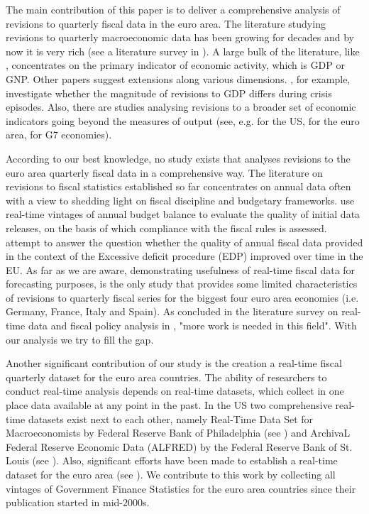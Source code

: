 The main contribution of this paper is to deliver a comprehensive analysis of revisions to quarterly fiscal data in the euro area. The literature studying revisions to quarterly macroeconomic data has been growing for decades and by now it is very rich (see a literature survey in \citet{Croushore_JEL}). A large bulk of the literature, like \citet{Mankiw-Shapiro_1986_NBER}, concentrates on the primary indicator of economic activity, which is GDP or GNP. Other papers suggest extensions along various dimensions. \citet{Shrestha-Marini_2013_IMF}, for example, investigate whether the magnitude of revisions to GDP differs during crisis episodes. Also, there are studies analysing revisions to a broader set of economic indicators going beyond the measures of output (see, e.g.  \citet{aruoba2006ijcb} for the US, \citet{Branchi-et-al_2007_ECB} for the euro area, \citet{Faust2005NewsAN} for G7 economies).

According to our  best knowledge, no study exists that analyses revisions to the euro area quarterly fiscal data in a comprehensive way. The literature on revisions to fiscal statistics established so far concentrates on annual data often with a view to shedding light on fiscal discipline and budgetary frameworks. \citet{decastroetal2013_jmcb} use real-time vintages of annual budget balance to evaluate the quality of initial data releases, on the basis of which compliance with the fiscal rules is assessed. \citet{MaurerKeweloh2017_ecb-sps} attempt to answer the question whether the quality of annual fiscal data provided in the context of the Excessive deficit procedure (EDP) improved over time in the EU. As far as we are aware, \citet{Asimakopoulosetal2020_sje} demonstrating usefulness of real-time fiscal data for forecasting purposes, is the only study that provides some limited characteristics of revisions to quarterly fiscal series for the biggest four euro area economies (i.e. Germany, France, Italy and Spain). As concluded in the literature survey on real-time data and fiscal policy analysis in \citet{Cimadomo_2016_jes}, "more work is needed in this field". With our analysis we try to fill the gap.

Another significant contribution of our study is the creation a real-time fiscal quarterly dataset for the euro area countries. The ability of researchers to conduct real-time analysis depends on real-time datasets, which collect in one place data available at any point in the past. In the US two comprehensive real-time datasets exist next to each other, namely Real-Time Data Set for Macroeconomists by Federal Reserve Bank of Philadelphia (see \citet{CROUSHORE2001111}) and ArchivaL Federal Reserve Economic Data (ALFRED) by the Federal Reserve Bank of St. Louis (see \citet{ALFRED}). Also, significant efforts have been made to establish a real-time dataset for the euro area (see \citet{Giannone-et-al_2010_RevEconStat}). We contribute to this work by collecting all vintages of Government Finance Statistics for the euro area countries since their publication started in mid-2000s.

